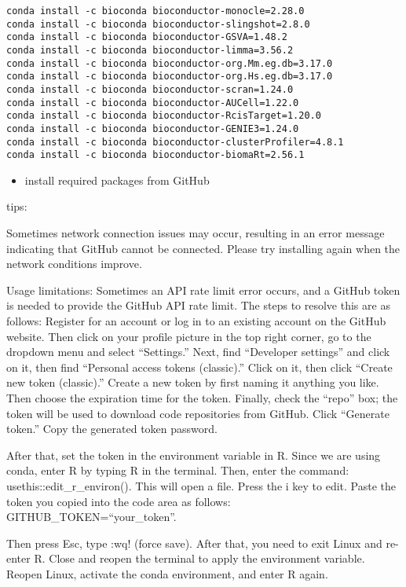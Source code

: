 \documentclass[
]{book}
\providecommand{\tightlist}{%
  \setlength{\itemsep}{0pt}\setlength{\parskip}{0pt}}
\begin{document}
\begin{verbatim}
conda install -c bioconda bioconductor-monocle=2.28.0
conda install -c bioconda bioconductor-slingshot=2.8.0
conda install -c bioconda bioconductor-GSVA=1.48.2
conda install -c bioconda bioconductor-limma=3.56.2
conda install -c bioconda bioconductor-org.Mm.eg.db=3.17.0
conda install -c bioconda bioconductor-org.Hs.eg.db=3.17.0
conda install -c bioconda bioconductor-scran=1.24.0
conda install -c bioconda bioconductor-AUCell=1.22.0
conda install -c bioconda bioconductor-RcisTarget=1.20.0
conda install -c bioconda bioconductor-GENIE3=1.24.0
conda install -c bioconda bioconductor-clusterProfiler=4.8.1
conda install -c bioconda bioconductor-biomaRt=2.56.1
\end{verbatim}

\begin{itemize}
\tightlist
\item
  install required packages from GitHub
\end{itemize}

tips:

Sometimes network connection issues may occur, resulting in an error message indicating that GitHub cannot be connected. Please try installing again when the network conditions improve.

Usage limitations: Sometimes an API rate limit error occurs, and a GitHub token is needed to provide the GitHub API rate limit. The steps to resolve this are as follows: Register for an account or log in to an existing account on the GitHub website. Then click on your profile picture in the top right corner, go to the dropdown menu and select ``Settings.'' Next, find ``Developer settings'' and click on it, then find ``Personal access tokens (classic).'' Click on it, then click ``Create new token (classic).'' Create a new token by first naming it anything you like. Then choose the expiration time for the token. Finally, check the ``repo'' box; the token will be used to download code repositories from GitHub. Click ``Generate token.'' Copy the generated token password.

After that, set the token in the environment variable in R. Since we are using conda, enter R by typing R in the terminal. Then, enter the command: usethis::edit\_r\_environ(). This will open a file. Press the i key to edit. Paste the token you copied into the code area as follows: GITHUB\_TOKEN=``your\_token''.

Then press Esc, type :wq! (force save). After that, you need to exit Linux and re-enter R. Close and reopen the terminal to apply the environment variable. Reopen Linux, activate the conda environment, and enter R again.
\end{document}

